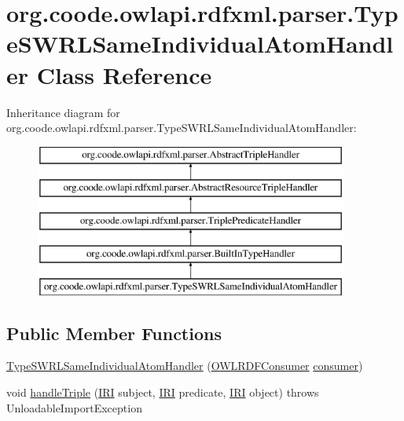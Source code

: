 \hypertarget{classorg_1_1coode_1_1owlapi_1_1rdfxml_1_1parser_1_1_type_s_w_r_l_same_individual_atom_handler}{\section{org.\-coode.\-owlapi.\-rdfxml.\-parser.\-Type\-S\-W\-R\-L\-Same\-Individual\-Atom\-Handler Class Reference}
\label{classorg_1_1coode_1_1owlapi_1_1rdfxml_1_1parser_1_1_type_s_w_r_l_same_individual_atom_handler}
}
Inheritance diagram for org.\-coode.\-owlapi.\-rdfxml.\-parser.\-Type\-S\-W\-R\-L\-Same\-Individual\-Atom\-Handler\-:\begin{figure}[H]
\begin{center}
\leavevmode
\includegraphics[height=5.000000cm]{classorg_1_1coode_1_1owlapi_1_1rdfxml_1_1parser_1_1_type_s_w_r_l_same_individual_atom_handler}
\end{center}
\end{figure}
\subsection*{Public Member Functions}
\begin{DoxyCompactItemize}
\item 
\hyperlink{classorg_1_1coode_1_1owlapi_1_1rdfxml_1_1parser_1_1_type_s_w_r_l_same_individual_atom_handler_a4a09db686d363d0108be54ea97abaefb}{Type\-S\-W\-R\-L\-Same\-Individual\-Atom\-Handler} (\hyperlink{classorg_1_1coode_1_1owlapi_1_1rdfxml_1_1parser_1_1_o_w_l_r_d_f_consumer}{O\-W\-L\-R\-D\-F\-Consumer} \hyperlink{classorg_1_1coode_1_1owlapi_1_1rdfxml_1_1parser_1_1_abstract_triple_handler_a4ccf4d898ff01eb1cadfa04b23d54e9c}{consumer})
\item 
void \hyperlink{classorg_1_1coode_1_1owlapi_1_1rdfxml_1_1parser_1_1_type_s_w_r_l_same_individual_atom_handler_a714dfb96a371135074073f3dac3e03f7}{handle\-Triple} (\hyperlink{classorg_1_1semanticweb_1_1owlapi_1_1model_1_1_i_r_i}{I\-R\-I} subject, \hyperlink{classorg_1_1semanticweb_1_1owlapi_1_1model_1_1_i_r_i}{I\-R\-I} predicate, \hyperlink{classorg_1_1semanticweb_1_1owlapi_1_1model_1_1_i_r_i}{I\-R\-I} object)  throws Unloadable\-Import\-Exception 
\end{DoxyCompactItemize}
